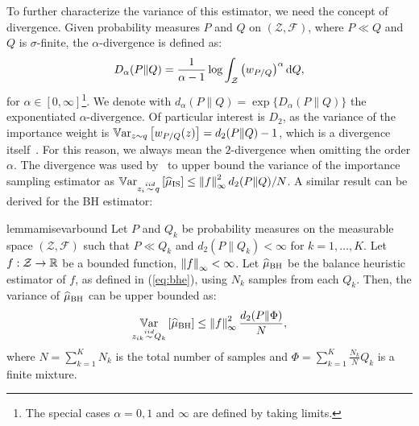 \documentclass{article}
\begin{document}
To further characterize the variance of this estimator, we need the concept of \Renyi divergence. Given probability measures $P$ and $Q$ on $(\mathcal{Z},\mathcal{F})$, where $P\ll Q$ and $Q$ is $\sigma$-finite, the $\alpha$-\Renyi divergence is defined as:
\begin{align}\label{eq:renyi}
	D_{\alpha}(P\|Q) = \frac{1}{\alpha-1}\log\int_{\mathcal{Z}}\left(w_{P/Q}\right)^{\alpha}\de Q,
\end{align}
for $\alpha\in[0,\infty]$\footnote{The special cases $\alpha=0,1$ and $\infty$ are defined by taking limits.}.
We denote with $d_{\alpha}(P\|Q) = \exp\{D_{\alpha}(P\|Q)\}$ the exponentiated $\alpha$-\Renyi divergence. Of particular interest is $D_2$, as the variance of the importance weight is $\Var_{z\sim q}\left[w_{P/Q}(z)\right] = d_2(P\|Q) - 1$, which is a divergence itself~\citep{cortes2010learning}. For this reason, we always mean the $2$-\Renyi divergence when omitting the order $\alpha$. The \Renyi divergence was used by~\citet[][Lemma 4.1]{metelli2018policy} to upper bound the variance of the importance sampling estimator as $\Var_{z_i\simiid q}\left[\wh{\mu}_{\text{IS}}\right]\leq \norm[\infty]{f}^2d_2(P\|Q)/N$. A similar result can be derived for the BH estimator:
%
\begin{restatable}{lemma}{misevarbound}\label{lem:misevarbound}
	Let $P$ and $Q_k$ be probability measures on the measurable space $(\mathcal{Z},\mathcal{F})$ such that $P\ll Q_k$ and $d_2(P\|Q_k)<\infty$ for $k=1,\dots,K$. Let $f:\mathcal{Z}\to\Reals$ be a bounded function, \ie $\norm[\infty]{f}<\infty$. Let $\wh{\mu}_{\text{BH}}$ be the balance heuristic estimator of $f$, as defined in (\ref{eq:bhe}), using $N_k$ \iid samples from each $Q_k$. Then, the variance of $\wh{\mu}_{\text{BH}}$ can be upper bounded as:
	\begin{align*}
		\Var_{z_{ik}\simiid Q_k}\left[\wh{\mu}_{\text{BH}}\right] \leq \norm[\infty]{f}^2\frac{d_2(P\|\Phi)}{N},
	\end{align*}
	where ${N=\sum_{k=1}^{K}N_k}$ is the total number of samples and ${\Phi=\sum_{k=1}^K\frac{N_k}{N}Q_k}$ is a finite mixture.
\end{restatable}
%
\end{document}
